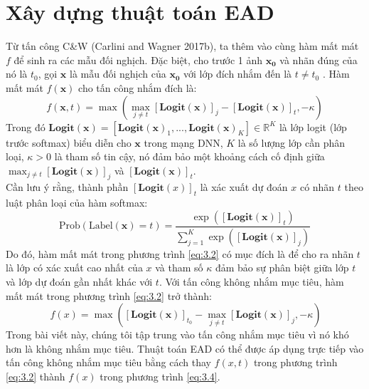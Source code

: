 \section{Xây dựng thuật toán EAD}

Từ tấn công C\&W (Carlini and Wagner 2017b), ta thêm vào cùng hàm mất mát $f$ để sinh 
ra các mẫu đối nghịch. Đặc biệt, cho trước 1 ảnh $\mathbf{x_0}$ và nhãn đúng của nó là $t_0$, 
gọi $\mathbf{x}$ là mẫu đối nghịch của $\mathbf{x_0}$ với lớp đích nhắm đến là $t \neq t_0$ . Hàm mất mát 
$f(\mathbf{x})$ cho tấn công nhắm đích là:
\begin{equation}
    \label{eq:3.2}
    f(\mathbf{x}, t) = \max { \left( \max_{j \neq t} [\textbf{Logit}(\mathbf{x})]_j - 
    [\textbf{Logit}(\mathbf{x})]_t, -\kappa \right) }
\end{equation}
Trong đó $\textbf{Logit}(\mathbf{x}) = [\textbf{Logit}(\mathbf{x})_1, ..., 
\textbf{Logit}(\mathbf{x})_K] 
\in \mathbb{R}^K$ là lớp logit (lớp trước softmax) biểu diễn cho $\mathbf{x}$ trong mạng DNN, $K$
là số lượng lớp cần phân loại, $\kappa > 0$ là tham số tin cậy, nó đảm bảo một khoảng 
cách cố định giữa $\max_{j \neq t} [\textbf{Logit}(\mathbf{x})]_j$ và $[\textbf{Logit}(\mathbf{x})]_t$. \\

Cần lưu ý rằng, thành phần $[\textbf{Logit}(x)]_t$ là xác xuất dự đoán $x$ có nhãn $t$ theo 
luật phân loại của hàm softmax:
\begin{equation}
    \label{eq:3.3}
    \text{Prob}(\text{Label}(\mathbf{x}) = t) = \frac{\exp([\textbf{Logit}(\mathbf{x})]_t)}{
        \sum_{j=1}^{K} \exp([\textbf{Logit}(\mathbf{x})]_j)
    }
\end{equation}
Do đó, hàm mất mát trong phương trình \ref{eq:3.2} có mục đích là để cho ra nhãn $t$ là 
lớp có xác xuất cao nhất của $x$ và tham số $\kappa$ đảm bảo sự phân biệt giữa lớp $t$
và lớp dự đoán gần nhất khác với $t$. Với tấn công không nhắm mục tiêu, hàm mất mát trong 
phương trình \ref{eq:3.2} trở thành:
\begin{equation}
    \label{eq:3.4}\
    f(x) = \max { \left([\textbf{Logit}(\mathbf{x})]_{t_0} - 
    \max_{j \neq t} [\textbf{Logit}(\mathbf{x})]_j, -\kappa \right) }
\end{equation}
Trong bài viết này, chúng tôi tập trung vào tấn công nhắm mục tiêu vì nó khó hơn là không 
nhắm mục tiêu. Thuật toán EAD có thể được áp dụng trực tiếp vào tấn công không nhắm mục 
tiêu bằng cách thay $f(x,t)$ trong phương trình \ref{eq:3.2} thành $f(x)$ trong phương 
trình \ref{eq:3.4}. \\

